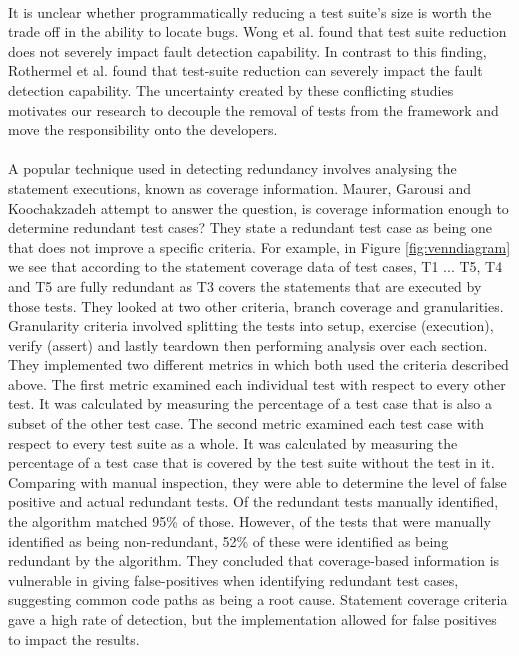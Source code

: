 \paragraph{}
It is unclear whether programmatically reducing a test suite's size is worth the trade off in the ability to locate bugs.  Wong et al. \cite{wong1995effect, wong1999test} found that test suite reduction does not severely impact fault detection capability. In contrast to this finding, Rothermel et al. \cite{rothermel1998empirical, rothermel2002empirical} found that test-suite reduction can severely impact the fault detection capability. The uncertainty created by these conflicting studies motivates our research to decouple the removal of tests from the framework and move the responsibility onto the developers. 
\paragraph{}
A popular technique used in detecting redundancy involves analysing the statement executions, known as coverage information. Maurer, Garousi and Koochakzadeh \cite{koochakzadeh2009test} attempt to answer the question, is coverage information enough to determine redundant test cases? They state a redundant test case as being one that does not improve a specific criteria. For example, in Figure \ref{fig:venndiagram} we see that according to the statement coverage data of test cases, T1 ... T5, T4 and T5 are fully redundant as T3 covers the statements that are executed by those tests. They looked at two other criteria, branch coverage and granularities. Granularity criteria involved splitting the tests into setup, exercise (execution), verify (assert) and lastly teardown then performing analysis over each section. They implemented two different metrics in which both used the criteria described above. The first metric examined each individual test with respect to every other test. It was calculated by measuring the percentage of a test case that is also a subset of the other test case. The second metric examined each test case with respect to every test suite as a whole. It was calculated by measuring the percentage of a test case that is covered by the test suite without the test in it. Comparing with manual inspection, they were able to determine the level of false positive and actual redundant tests. Of the redundant tests manually identified, the algorithm matched 95\% of those. However, of the tests that were manually identified as being non-redundant, 52\% of these were identified as being redundant by the algorithm. They concluded that coverage-based information is vulnerable in giving false-positives when identifying redundant test cases, suggesting common code paths as being a root cause. Statement coverage criteria gave a high rate of detection, but the implementation allowed for false positives to impact the results. 

